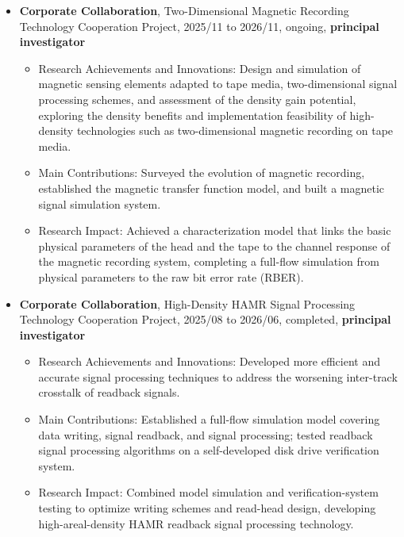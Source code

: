 \documentclass[en]{resume}
\begin{document}
\begin{itemize}
  \item \textbf{Corporate Collaboration}, Two-Dimensional Magnetic Recording Technology Cooperation Project, 2025/11 to 2026/11, ongoing, \textbf{principal investigator}
  \begin{itemize}
    \item Research Achievements and Innovations: Design and simulation of magnetic sensing elements adapted to tape media, two-dimensional signal processing schemes, and assessment of the density gain potential, exploring the density benefits and implementation feasibility of high-density technologies such as two-dimensional magnetic recording on tape media.
    \item Main Contributions: Surveyed the evolution of magnetic recording, established the magnetic transfer function model, and built a magnetic signal simulation system.
    \item Research Impact: Achieved a characterization model that links the basic physical parameters of the head and the tape to the channel response of the magnetic recording system, completing a full-flow simulation from physical parameters to the raw bit error rate (RBER).
  \end{itemize}

  \item \textbf{Corporate Collaboration}, High-Density HAMR Signal Processing Technology Cooperation Project, 2025/08 to 2026/06, completed, \textbf{principal investigator}
  \begin{itemize}
    \item Research Achievements and Innovations: Developed more efficient and accurate signal processing techniques to address the worsening inter-track crosstalk of readback signals.
    \item Main Contributions: Established a full-flow simulation model covering data writing, signal readback, and signal processing; tested readback signal processing algorithms on a self-developed disk drive verification system.
    \item Research Impact: Combined model simulation and verification-system testing to optimize writing schemes and read-head design, developing high-areal-density HAMR readback signal processing technology.
  \end{itemize}


\end{itemize}
\end{document}
